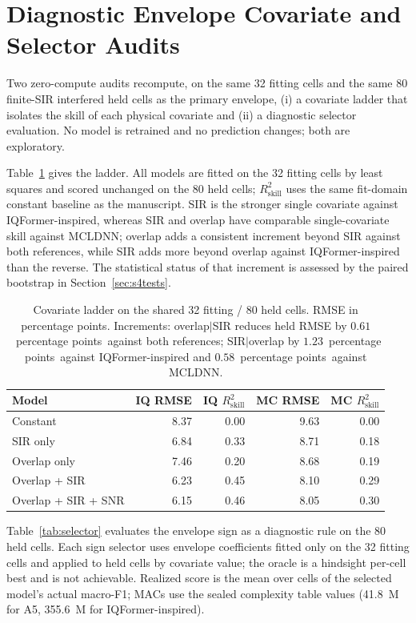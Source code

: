 \documentclass[letterpaper,onecolumn,11pt,journal]{IEEEtran}
\newcommand{\pp}{percentage points}
\begin{document}
\section{Diagnostic Envelope Covariate and Selector Audits}
Two zero-compute audits recompute, on the same 32 fitting cells and the same
80 finite-SIR interfered held cells as the primary envelope, (i) a covariate
ladder that isolates the skill of each physical covariate and (ii) a
diagnostic selector evaluation. No model is retrained and no prediction
changes; both are exploratory.

Table~\ref{tab:ladder} gives the ladder. All models are fitted on the 32
fitting cells by least squares and scored unchanged on the 80 held cells;
$R^2_{\mathrm{skill}}$ uses the same fit-domain constant baseline as the
manuscript. SIR is the stronger single covariate against IQFormer-inspired,
whereas SIR and overlap have comparable single-covariate skill against
MCLDNN; overlap adds a consistent increment beyond SIR against both
references, while SIR adds more beyond overlap against IQFormer-inspired
than the reverse. The statistical status of that increment is assessed by the
paired bootstrap in Section~\ref{sec:s4tests}.

\begin{table}[t]
\centering
\caption{Covariate ladder on the shared 32 fitting / 80 held cells. RMSE in
\pp. Increments: overlap$|$SIR reduces held RMSE by $0.61$~\pp\ against both
references; SIR$|$overlap by $1.23$~\pp\ against IQFormer-inspired and
$0.58$~\pp\ against MCLDNN.}
\label{tab:ladder}
\footnotesize
\setlength{\tabcolsep}{4pt}
\begin{tabular}{lrrrr}
\toprule
Model & IQ RMSE & IQ $R^2_{\mathrm{skill}}$ & MC RMSE & MC $R^2_{\mathrm{skill}}$\\
\midrule
Constant & 8.37 & 0.00 & 9.63 & 0.00\\
SIR only & 6.84 & 0.33 & 8.71 & 0.18\\
Overlap only & 7.46 & 0.20 & 8.68 & 0.19\\
Overlap + SIR & 6.23 & 0.45 & 8.10 & 0.29\\
Overlap + SIR + SNR & 6.15 & 0.46 & 8.05 & 0.30\\
\bottomrule
\end{tabular}
\end{table}

Table~\ref{tab:selector} evaluates the envelope sign as a diagnostic rule on
the 80 held cells. Each sign selector uses envelope coefficients fitted only
on the 32 fitting cells and applied to held cells by covariate value; the
oracle is a hindsight per-cell best and is not achievable. Realized score is
the mean over cells of the selected model's actual macro-F1; MACs use the
sealed complexity table values (41.8~M for A5, 355.6~M for IQFormer-inspired).
\end{document}
